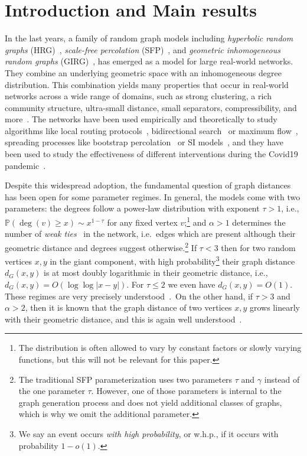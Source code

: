 \documentclass[11pt, letterpaper, margin=1in]{amsart}
\theoremstyle{definition}
\theoremstyle{remark}
\renewcommand{\Pr}[1]{\ensuremath{\mathbb{P} \left(#1 \right) }}
\numberwithin{equation}{section}
\begin{document}
\newpage

\section{Introduction and Main results}\label{intro}

In the last years, a family of random graph models including \emph{hyperbolic random graphs} (HRG)~\cite{krioukov2010hyperbolic}, \emph{scale-free percolation} (SFP)~\cite{deijfen2013scale}, and \emph{geometric inhomogeneous random graphs} (GIRG)~\cite{bringmann2019geometric}, has emerged as a model for large real-world networks. They combine an underlying geometric space with an inhomogeneous degree distribution. This combination yields many properties that occur in real-world networks across a wide range of domains, such as strong clustering, a rich community structure, ultra-small distance, small separators, compressibility, and more~\cite{bringmann2019geometric}. The networks have been used empirically and theoretically to study algorithms like local routing protocols~\cite{blasius2020hyperbolic,boguna2010sustaining,bringmann2022greedy}, bidirectional search~\cite{blasius2024external} or maximum flow~\cite{blasius2020efficiently}, spreading processes like bootstrap percolation~\cite{koch2021bootstrap} or SI models~\cite{komjathy2020explosion,komjathy2021penalising,komjathy2023four,komjathy2023fourtwo}, and they have been used to study the effectiveness of different interventions during the Covid19 pandemic~\cite{goldberg2021increasing,jorritsma2020not,odor2021switchover}.

Despite this widespread adoption, the fundamental question of graph distances has been open for some parameter regimes. In general, the models come with two parameters: the degrees follow a power-law distribution with exponent $\tau > 1$, i.e., $\Pr{\deg(v) \ge x} \sim x^{1-\tau}$ for any fixed vertex $v$;\footnote{The distribution is often allowed to vary by constant factors or slowly varying functions, but this will not be relevant for this paper.} and $\alpha >1$ determines the number of \emph{weak ties}~\cite{granovetter1973strength} in the network, i.e.\ edges which are present although their geometric distance and degrees suggest otherwise.\footnote{The traditional SFP parameterization uses two parameters $\tau$ and $\gamma$ instead of the one parameter $\tau$. However, one of those parameters is internal to the graph generation process and does not yield additional classes of graphs, which is why we omit the additional parameter.} If $\tau < 3$ then for two random vertices $x,y$ in the giant component, with high probability\footnote{We say an event occurs \emph{with high probability}, or w.h.p., if it occurs with probability $1 - o(1)$.} their graph distance $d_G(x,y)$ is at most doubly logarithmic in their geometric distance, i.e., $d_G(x,y) = O(\log \log |x-y|)$. For $\tau \le 2$ we even have $d_G(x,y) = O(1)$. These regimes are very precisely understood~\cite{abdullah2017typical,bringmann2016average,deijfen2013scale}.\ On the other hand, if $\tau > 3$ and $\alpha >2$, then it is known that the graph distance of two vertices $x,y$ grows linearly with their geometric distance, and this is again well understood~\cite{deprez2015inhomogeneous,Berger_2004}. 
\end{document}
